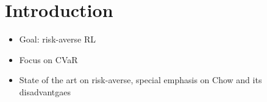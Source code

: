 \chapter{Introduction}
\label{sec:introduction}

\begin{itemize}
    \item Goal: risk-averse RL
    \item Focus on CVaR
    \item State of the art on risk-averse, special emphasis on Chow and its disadvantgaes
\end{itemize}